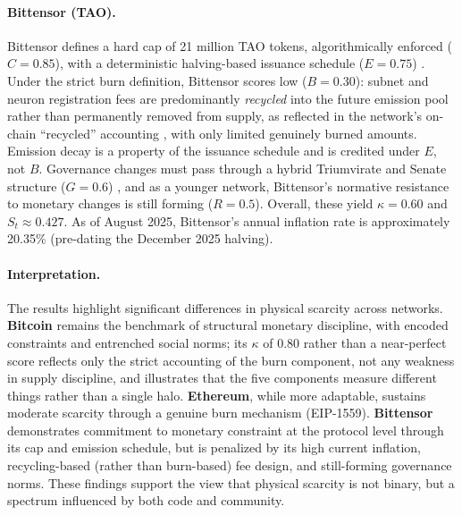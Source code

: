 \documentclass[12pt]{article}
\begin{document}
\paragraph{Bittensor (TAO).}
Bittensor defines a hard cap of 21 million TAO tokens, algorithmically enforced (\(C = 0.85\)), with a deterministic halving-based issuance schedule (\(E = 0.75\)) \citep{rao2020bittensor, opentensor2023taoeconomy}. Under the strict burn definition, Bittensor scores low (\(B = 0.30\)): subnet and neuron registration fees are predominantly \emph{recycled} into the future emission pool rather than permanently removed from supply, as reflected in the network's on-chain ``recycled'' accounting \citep{taostats_accounts}, with only limited genuinely burned amounts. Emission decay is a property of the issuance schedule and is credited under \(E\), not \(B\). Governance changes must pass through a hybrid Triumvirate and Senate structure (\(G = 0.6\)) \citep{opentensor_governance}, and as a younger network, Bittensor's normative resistance to monetary changes is still forming (\(R = 0.5\)). Overall, these yield \( \kappa = 0.60 \) and \( S_t \approx 0.427 \). As of August 2025, Bittensor's annual inflation rate is approximately 20.35\% (pre-dating the December 2025 halving).


\vspace{0.3cm}
\paragraph{Interpretation.}

The results highlight significant differences in physical scarcity across networks. \textbf{Bitcoin} remains the benchmark of structural monetary discipline, with encoded constraints and entrenched social norms; its \( \kappa \) of 0.80 rather than a near-perfect score reflects only the strict accounting of the burn component, not any weakness in supply discipline, and illustrates that the five components measure different things rather than a single halo. \textbf{Ethereum}, while more adaptable, sustains moderate scarcity through a genuine burn mechanism (EIP-1559). \textbf{Bittensor} demonstrates commitment to monetary constraint at the protocol level through its cap and emission schedule, but is penalized by its high current inflation, recycling-based (rather than burn-based) fee design, and still-forming governance norms. These findings support the view that physical scarcity is not binary, but a spectrum influenced by both code and community.
\end{document}
